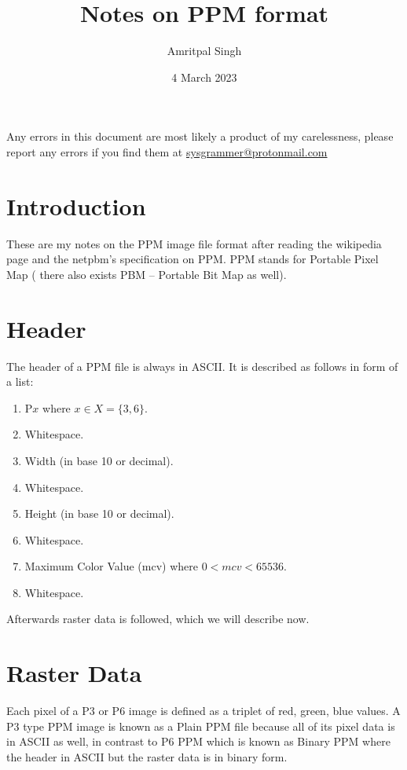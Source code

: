 \documentclass{article}
\title{Notes on PPM format}
\author{Amritpal Singh}
\date{4 March 2023}
\begin{document}
\maketitle

\newpage
\tableofcontents
\vspace{400px}
Any errors in this document are most likely a product of my carelessness, 
please report any errors if you find them at
\href{mailto:sysgrammer@protonmail.com}{sysgrammer@protonmail.com}

\newpage
\section{Introduction}
These are my notes on the PPM image file format after reading the wikipedia page
and the netpbm's specification on PPM. PPM stands for Portable Pixel Map (
there also exists PBM -- Portable Bit Map as well).

\section{Header}
The header of a PPM file is always in ASCII. It is described as follows in form
of a list:
\begin{enumerate}
    \item P$x$ where $x \in X = \{3, 6\}$.
    \item Whitespace.\footnotemark[1]
    \item Width (in base 10 or decimal).
    \item Whitespace.\footnotemark[1]
    \item Height (in base 10 or decimal).
    \item Whitespace.\footnotemark[1]
    \item Maximum Color Value (mcv) where $0 < mcv < 65536$.
    \item Whitespace.\footnotemark[1]
\end{enumerate}


Afterwards raster data is followed, which we will describe now.

\section{Raster Data}

Each pixel of a P3 or P6 image is defined as a triplet of red, green, blue
values. A P3 type PPM image is known as a Plain PPM file because all of its
pixel data is in ASCII as well, in contrast to P6 PPM which is known as Binary
PPM where the header in ASCII but the raster data is in binary form.
\end{document}
